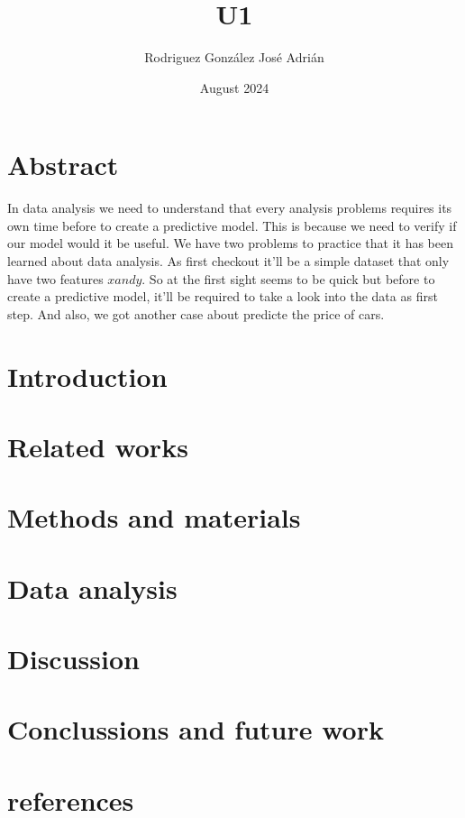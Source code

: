 \documentclass{article}
\title{U1}
\author{Rodriguez González José Adrián }
\date{August 2024}
\begin{document}
\maketitle

\section{Abstract}
In data analysis we need to understand that every analysis problems requires its own time before to create a predictive model. This is because we need to verify if our model would it be useful.
We have two problems to practice that it has been learned about data analysis. As first checkout it'll be a simple dataset that only have two features \(x and y\). So at the first sight seems to be quick but before to create a predictive model, it'll be required to take a look into the data as first step. And also, we got another case about predicte the price of cars.
\section{Introduction}
\section{Related works}
\section{Methods and materials}
\section{Data analysis}
\section{Discussion}
\section{Conclussions and future work}
\section{references}
\end{document}
